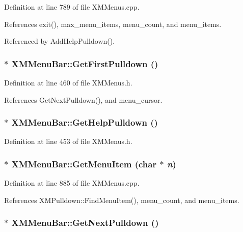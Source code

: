 Definition at line 789 of file XMMenus.cpp.

References exit(), max\_\-menu\_\-items, menu\_\-count, and menu\_\-items.

Referenced by Add\-Help\-Pulldown().
\subsubsection{$\ast$ XMMenu\-Bar::Get\-First\-Pulldown ()\hspace{0.3cm}{\tt  [inline]}}\label{classXMMenuBar_a11}




Definition at line 460 of file XMMenus.h.

References Get\-Next\-Pulldown(), and menu\_\-cursor.
\subsubsection{$\ast$ XMMenu\-Bar::Get\-Help\-Pulldown ()\hspace{0.3cm}{\tt  [inline]}}\label{classXMMenuBar_a8}




Definition at line 453 of file XMMenus.h.
\subsubsection{ $\ast$ XMMenu\-Bar::Get\-Menu\-Item (char $\ast$ {\em n})}\label{classXMMenuBar_a9}




Definition at line 885 of file XMMenus.cpp.

References XMPulldown::Find\-Menu\-Item(), menu\_\-count, and menu\_\-items.
\subsubsection{ $\ast$ XMMenu\-Bar::Get\-Next\-Pulldown ()}\label{classXMMenuBar_a10}




